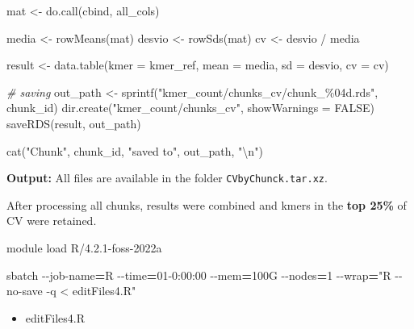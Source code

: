 \documentclass[
]{book}
\newenvironment{Shaded}{\begin{snugshade}}{\end{snugshade}}
\newcommand{\AttributeTok}[1]{\textcolor[rgb]{0.77,0.63,0.00}{#1}}
\newcommand{\CommentTok}[1]{\textcolor[rgb]{0.56,0.35,0.01}{\textit{#1}}}
\newcommand{\ConstantTok}[1]{\textcolor[rgb]{0.00,0.00,0.00}{#1}}
\newcommand{\ExtensionTok}[1]{#1}
\newcommand{\FunctionTok}[1]{\textcolor[rgb]{0.00,0.00,0.00}{#1}}
\newcommand{\NormalTok}[1]{#1}
\newcommand{\OperatorTok}[1]{\textcolor[rgb]{0.81,0.36,0.00}{\textbf{#1}}}
\newcommand{\OtherTok}[1]{\textcolor[rgb]{0.56,0.35,0.01}{#1}}
\newcommand{\SpecialCharTok}[1]{\textcolor[rgb]{0.00,0.00,0.00}{#1}}
\newcommand{\StringTok}[1]{\textcolor[rgb]{0.31,0.60,0.02}{#1}}
\providecommand{\tightlist}{%
  \setlength{\itemsep}{0pt}\setlength{\parskip}{0pt}}
\begin{document}
\begin{Shaded}
\begin{Highlighting}[]
\NormalTok{mat }\OtherTok{\textless{}{-}} \FunctionTok{do.call}\NormalTok{(cbind, all\_cols)}

\NormalTok{media }\OtherTok{\textless{}{-}} \FunctionTok{rowMeans}\NormalTok{(mat)}
\NormalTok{desvio }\OtherTok{\textless{}{-}} \FunctionTok{rowSds}\NormalTok{(mat)}
\NormalTok{cv }\OtherTok{\textless{}{-}}\NormalTok{ desvio }\SpecialCharTok{/}\NormalTok{ media}

\NormalTok{result }\OtherTok{\textless{}{-}} \FunctionTok{data.table}\NormalTok{(}\AttributeTok{kmer =}\NormalTok{ kmer\_ref, }\AttributeTok{mean =}\NormalTok{ media, }\AttributeTok{sd =}\NormalTok{ desvio, }\AttributeTok{cv =}\NormalTok{ cv)}

\CommentTok{\# saving}
\NormalTok{out\_path }\OtherTok{\textless{}{-}} \FunctionTok{sprintf}\NormalTok{(}\StringTok{"kmer\_count/chunks\_cv/chunk\_\%04d.rds"}\NormalTok{, chunk\_id)}
\FunctionTok{dir.create}\NormalTok{(}\StringTok{"kmer\_count/chunks\_cv"}\NormalTok{, }\AttributeTok{showWarnings =} \ConstantTok{FALSE}\NormalTok{)}
\FunctionTok{saveRDS}\NormalTok{(result, out\_path)}

\FunctionTok{cat}\NormalTok{(}\StringTok{"Chunk"}\NormalTok{, chunk\_id, }\StringTok{"saved to"}\NormalTok{, out\_path, }\StringTok{"}\SpecialCharTok{\textbackslash{}n}\StringTok{"}\NormalTok{)}
\end{Highlighting}
\end{Shaded}

\textbf{Output:} All files are available in the folder \texttt{CVbyChunck.tar.xz}.

After processing all chunks, results were combined and kmers in the \textbf{top 25\%} of CV were retained.

\begin{Shaded}
\begin{Highlighting}[]
\ExtensionTok{module}\NormalTok{ load R/4.2.1{-}foss{-}2022a}

\ExtensionTok{sbatch} \AttributeTok{{-}{-}job{-}name}\OperatorTok{=}\NormalTok{R }\AttributeTok{{-}{-}time}\OperatorTok{=}\NormalTok{01{-}0:00:00 }\AttributeTok{{-}{-}mem}\OperatorTok{=}\NormalTok{100G }\AttributeTok{{-}{-}nodes}\OperatorTok{=}\NormalTok{1 }\AttributeTok{{-}{-}wrap}\OperatorTok{=}\StringTok{"R {-}{-}no{-}save {-}q \textless{} editFiles4.R"}
\end{Highlighting}
\end{Shaded}

\begin{itemize}
\tightlist
\item
  editFiles4.R
\end{itemize}
\end{document}
